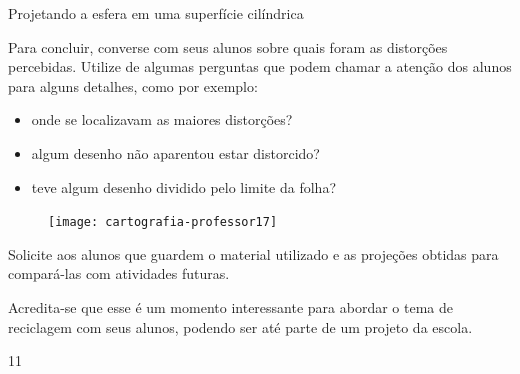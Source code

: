 \clearmargin
\begin{sugestions}{Projetando a esfera em uma superfície cilíndrica}
{
  Para concluir, converse com seus alunos sobre quais foram as distorções percebidas. Utilize de algumas perguntas que podem chamar a atenção dos alunos para alguns detalhes, como por exemplo:
  \begin{itemize}
  \item onde se localizavam as maiores distorções?
  \item algum desenho não aparentou estar distorcido?
  \item teve algum desenho dividido pelo limite da folha?
  \end{itemize}

  \begin{figure}[H]
  \centering
  
  \texttt{[image: cartografia-professor17]}
  \end{figure}

  Solicite aos alunos que guardem o material utilizado e as projeções obtidas para compará-las com atividades futuras.

  Acredita-se que esse é um momento interessante para abordar o tema de reciclagem com seus alunos, podendo ser até parte de um projeto da escola.
  }{1}{1}
\end{sugestions}

\label{Pcilindricas}

